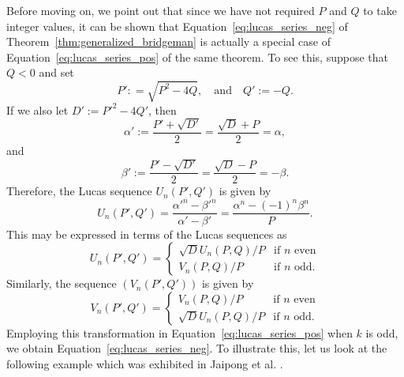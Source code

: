 \documentclass[10pt]{article}
\theoremstyle{definition}
\begin{document}
Before moving on, we point out that since we have not required $P$ and $Q$ to take integer values, it can be shown that Equation~\eqref{eq:lucas_series_neg} of Theorem~\ref{thm:generalized_bridgeman} is actually a special case of Equation~\eqref{eq:lucas_series_pos} of the same theorem.  To see this, suppose that $Q < 0$ and set
    \begin{equation*}
        P': = \sqrt{P^2-4Q}, \quad \text{and} \quad Q' := -Q.
    \end{equation*}
    If we also let $D' := {P'}^2- 4Q'$, then
    \begin{equation*}
        \alpha' := \frac{P'+\sqrt{D'}}{2} = \frac{\sqrt{D}+P}{2} = \alpha,
    \end{equation*}
    and
    \begin{equation*}
        \beta' := \frac{P'-\sqrt{D'}}{2} = \frac{\sqrt{D}-P}{2} = -\beta.
    \end{equation*}
    Therefore, the Lucas sequence $U_n(P',Q')$ is given by
    \begin{equation*}
        U_n(P',Q') = \frac{{\alpha'}^n - {\beta'}^n}{\alpha' - \beta'} = \frac{\alpha^n-(-1)^n \beta^n}{P}.
    \end{equation*}
    This may be expressed in terms of the Lucas sequences as
    \begin{equation*}
         U_n(P',Q') = \begin{cases}
            \sqrt{D}U_n(P,Q)/P & \text{if } n \text{ even} \\
            V_n(P,Q)/P & \text{if } n \text{ odd}.
        \end{cases}
    \end{equation*}
    Similarly, the sequence $(V_n(P',Q'))$ is given by
    \begin{equation*}
         V_n(P',Q') = \begin{cases}
            V_n(P,Q)/P & \text{if } n \text{ even} \\
            \sqrt{D}U_n(P,Q)/P & \text{if } n \text{ odd}.
        \end{cases}
    \end{equation*}
    Employing this transformation in Equation~\eqref{eq:lucas_series_pos} when $k$ is odd, we obtain Equation~\eqref{eq:lucas_series_neg}. 
 To illustrate this, let us look at the following example which was exhibited in Jaipong et al. \cite{jaipong2023}.
\end{document}
